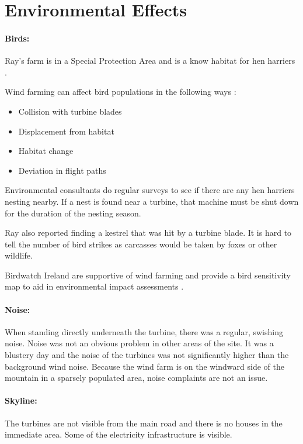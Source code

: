 \documentclass[12pt]{article} %
\begin{document}
\section{Environmental Effects}

\paragraph{Birds:} 
Ray's farm is in a Special Protection Area and is a know habitat for hen harriers \cite{spa}.

Wind farming can affect bird populations in the following ways \cite{birds}:
  \begin{itemize}
    \item{Collision with turbine blades}
    \item{Displacement from habitat}
    \item{Habitat change}
    \item{Deviation in flight paths}
  \end{itemize}

Environmental consultants do regular surveys to see if there are any hen harriers nesting nearby. If a nest is found near a turbine, that machine must be shut down for the duration of the nesting season.

Ray also reported finding a kestrel that was hit by a turbine blade. It is hard to tell the number of bird strikes as carcasses would be taken by foxes or other wildlife.

Birdwatch Ireland are supportive of wind farming and provide a bird sensitivity map to aid in environmental impact assessments \cite{bird_tool}.

\paragraph{Noise:} When standing directly underneath the turbine, there was a regular, swishing noise. Noise was not an obvious problem in other areas of the site. It was a blustery day and the noise of the turbines was not significantly higher than the background wind noise.
Because the wind farm is on the windward side of the mountain in a sparsely populated area, noise complaints are not an issue.

\paragraph{Skyline:} The turbines are not visible from the main road and there is no houses in the immediate area. Some of the electricity infrastructure is visible.
\end{document}
